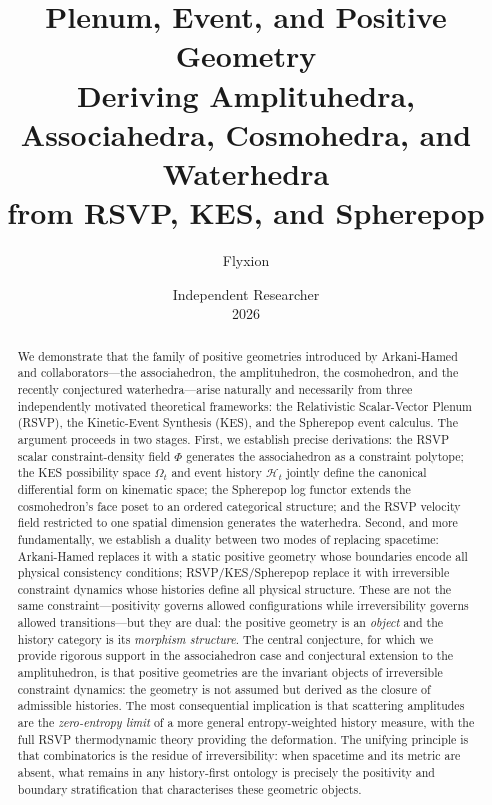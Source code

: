 \documentclass[12pt, oneside]{amsart}
\title{\textbf{Plenum, Event, and Positive Geometry}\\[0.6em]
\large Deriving Amplituhedra, Associahedra, Cosmohedra, and Waterhedra\\
from RSVP, KES, and Spherepop}
\author{Flyxion}
\date{Independent Researcher\\[0.3em] 2026}
\theoremstyle{plain}
\theoremstyle{definition}
\theoremstyle{remark}
\newcommand{\Phif}{\Phi}   %
\newcommand{\OmKS}{\Omega}
\newcommand{\HKS}{\mathcal{H}}
\begin{document}

\maketitle
\thispagestyle{empty}

\begin{abstract}
We demonstrate that the family of positive geometries introduced by Arkani-Hamed and collaborators---the associahedron, the amplituhedron, the cosmohedron, and the recently conjectured waterhedra---arise naturally and necessarily from three independently motivated theoretical frameworks: the Relativistic Scalar-Vector Plenum (RSVP), the Kinetic-Event Synthesis (KES), and the Spherepop event calculus. The argument proceeds in two stages. First, we establish precise derivations: the RSVP scalar constraint-density field $\Phif$ generates the associahedron as a constraint polytope; the KES possibility space $\OmKS_t$ and event history $\HKS_t$ jointly define the canonical differential form on kinematic space; the Spherepop log functor extends the cosmohedron's face poset to an ordered categorical structure; and the RSVP velocity field restricted to one spatial dimension generates the waterhedra. Second, and more fundamentally, we establish a duality between two modes of replacing spacetime: Arkani-Hamed replaces it with a static positive geometry whose boundaries encode all physical consistency conditions; RSVP/KES/Spherepop replace it with irreversible constraint dynamics whose histories define all physical structure. These are not the same constraint---positivity governs allowed configurations while irreversibility governs allowed transitions---but they are dual: the positive geometry is an \emph{object} and the history category is its \emph{morphism structure}. The central conjecture, for which we provide rigorous support in the associahedron case and conjectural extension to the amplituhedron, is that positive geometries are the invariant objects of irreversible constraint dynamics: the geometry is not assumed but derived as the closure of admissible histories. The most consequential implication is that scattering amplitudes are the \emph{zero-entropy limit} of a more general entropy-weighted history measure, with the full RSVP thermodynamic theory providing the deformation. The unifying principle is that combinatorics is the residue of irreversibility: when spacetime and its metric are absent, what remains in any history-first ontology is precisely the positivity and boundary stratification that characterises these geometric objects.
\end{abstract}
\end{document}
